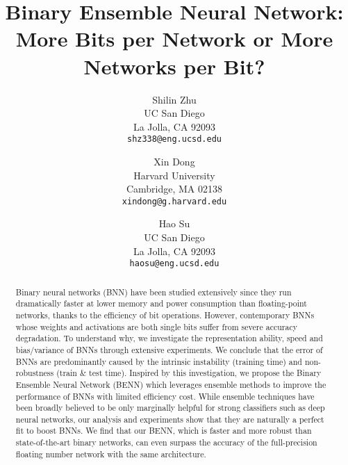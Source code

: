 \documentclass[10pt,twocolumn,letterpaper]{article}
\title{Binary Ensemble Neural Network:\\ More Bits per Network or More Networks per Bit?}
\begin{document}
\author{
  Shilin Zhu \\
  UC San Diego\\
  La Jolla, CA 92093 \\
  {\tt\small shz338@eng.ucsd.edu} \\
  \and
  Xin Dong \\
  Harvard University\\
  Cambridge, MA 02138 \\
  {\tt\small xindong@g.harvard.edu} \\
  \and
  Hao Su \\
  UC San Diego\\
  La Jolla, CA 92093 \\
  {\tt\small haosu@eng.ucsd.edu} \\
}

\maketitle

\begin{abstract}
    Binary neural networks (BNN) have been studied extensively since they run dramatically faster at lower memory and power consumption than floating-point networks, thanks to the efficiency of bit operations. However, contemporary BNNs whose weights and activations are both single bits suffer from severe accuracy degradation. To understand why, we investigate the representation ability, speed and bias/variance of BNNs through extensive experiments. We conclude that the error of BNNs are predominantly caused by the intrinsic instability (training time) and non-robustness (train \& test time). Inspired by this investigation, we propose the Binary Ensemble Neural Network (BENN) which leverages ensemble methods to improve the performance of BNNs with limited efficiency cost. While ensemble techniques have been broadly believed to be only marginally helpful for strong classifiers such as deep neural networks, our analysis and experiments show that they are naturally a perfect fit to boost BNNs. We find that our BENN, which is faster and more robust than state-of-the-art binary networks, can even surpass the accuracy of the full-precision floating number network with the same architecture. %
\end{abstract}
\vspace{-6mm}
\end{document}
